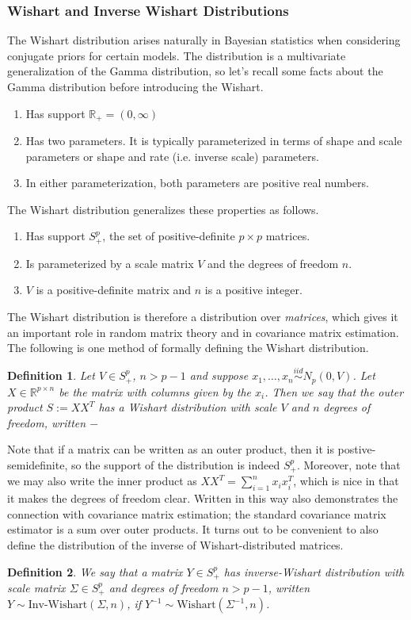 \documentclass[12pt]{article}
\newcommand{\R}{\mathcal{R}}
\def\R{\mathbb{R}}
\newtheorem{definition}{Definition}
\begin{document}
\subsubsection{Wishart and Inverse Wishart Distributions}
The Wishart distribution arises naturally in Bayesian statistics when considering conjugate priors for certain models. The distribution is a multivariate generalization of the Gamma distribution, so 
let's recall some facts about the Gamma distribution before introducing the Wishart. 
\begin{enumerate}
\item Has support $\R_+ = (0, \infty)$ 
\item Has two parameters. It is typically parameterized in terms of shape and scale parameters or shape and rate (i.e. inverse scale) parameters.
\item In either parameterization, both parameters are positive real numbers.  
\end{enumerate}
The Wishart distribution generalizes these properties as follows. 
\begin{enumerate}
\item Has support $S_+^p$, the set of positive-definite $p \times p$ matrices. 
\item Is parameterized by a scale matrix $V$ and the degrees of freedom $n$. 
\item $V$ is a positive-definite matrix and $n$ is a positive integer. 
\end{enumerate}

The Wishart distribution is therefore a distribution over \textit{matrices}, which gives it an important role in random matrix theory and in covariance matrix estimation. 
The following is one method of formally defining the Wishart distribution. 
\begin{definition}
Let $V \in S_+^p$, $n > p- 1$ and suppose $x_1, \dots, x_n \overset{iid}{\sim} N_p(0, V)$. Let $X \in \R^{p \times n}$ be the matrix with columns given by the $x_i$. Then we say that
the outer product $S := XX^T$ has a Wishart distribution with scale $V$ and $n$ degrees of freedom, written $-$
\end{definition}
Note that if a matrix can be written as an outer product, then it is postive-semidefinite, so the support of the distribution is indeed $S_+^p$. Moreover, note that we may also 
write the inner product as $XX^T = \sum_{i = 1}^{n} x_i x_i^T$, which is nice in that it makes the degrees of freedom clear. Written in this way also demonstrates the connection
with covariance matrix estimation; the standard covariance matrix estimator is a sum over outer products. It turns out to be convenient to also define the distribution of the inverse 
of Wishart-distributed matrices. 
\begin{definition}
We say that a matrix $Y \in S_+^p$ has inverse-Wishart distribution with scale matrix $\Sigma \in S_+^p$ and degrees of freedom $n > p - 1$, written $Y \sim \text{Inv-Wishart}(\Sigma, n)$, 
if $Y^{-1} \sim \text{Wishart}(\Sigma^{-1}, n)$. 
\end{definition}
\end{document}
